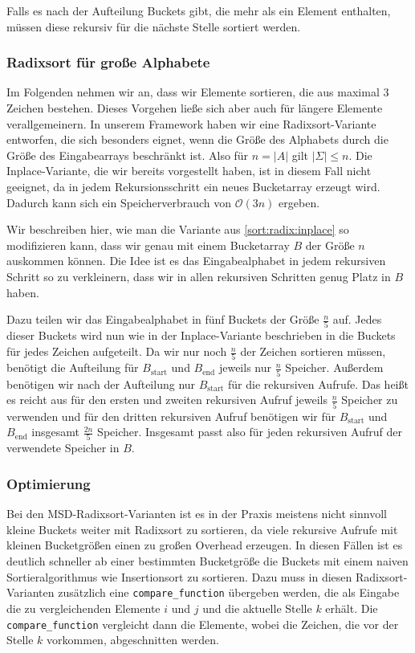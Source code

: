 Falls es nach der Aufteilung Buckets gibt, die mehr als ein Element enthalten,
müssen diese rekursiv für die nächste Stelle sortiert werden.

\subsubsection{Radixsort für große Alphabete}
\label{sort:radix:big_alph}

Im Folgenden nehmen wir an, dass wir Elemente sortieren,
die aus maximal $3$ Zeichen bestehen. Dieses Vorgehen ließe sich aber auch für längere Elemente verallgemeinern.
In unserem Framework haben wir eine Radixsort-Variante entworfen, die sich besonders eignet,
wenn die Größe des Alphabets durch die Größe des Eingabearrays beschränkt ist.
Also für $n=|A|$ gilt $|\Sigma| \le n$. Die Inplace-Variante, die wir bereits vorgestellt haben,
ist in diesem Fall nicht geeignet, da in jedem Rekursionsschritt ein neues Bucketarray erzeugt wird.
Dadurch kann sich ein Speicherverbrauch von $\mathcal O(3n)$ ergeben.

Wir beschreiben hier, wie man die Variante aus \cref{sort:radix:inplace} so modifizieren kann,
dass wir genau mit einem Bucketarray $B$ der Größe $n$ auskommen können.
Die Idee ist es das Eingabealphabet in jedem rekursiven Schritt so zu verkleinern,
dass wir in allen rekursiven Schritten genug Platz in $B$ haben.

Dazu teilen wir das Eingabealphabet in fünf Buckets der Größe $\frac{n}{5}$ auf.
Jedes dieser Buckets wird nun wie in der Inplace-Variante beschrieben in die Buckets für jedes Zeichen aufgeteilt.
Da wir nur noch $\frac{n}{5}$ der Zeichen sortieren müssen,
benötigt die Aufteilung für $B_{\text{start}}$ und $B_{\text{end}}$ jeweils nur $\frac{n}{5}$ Speicher.
Außerdem benötigen wir nach der Aufteilung nur $B_{\text{start}}$ für die rekursiven Aufrufe.
Das heißt es reicht aus für den ersten und zweiten rekursiven Aufruf jeweils $\frac{n}{5}$ Speicher zu verwenden
und für den dritten rekursiven Aufruf benötigen wir für $B_{\text{start}}$ und $B_{\text{end}}$
insgesamt $\frac{2n}{5}$ Speicher. Insgesamt passt also für jeden rekursiven Aufruf der verwendete Speicher in $B$.

\subsubsection{Optimierung}

Bei den MSD-Radixsort-Varianten ist es in der Praxis meistens nicht sinnvoll kleine Buckets
weiter mit Radixsort zu sortieren, da viele rekursive Aufrufe mit kleinen Bucketgrößen einen zu großen Overhead erzeugen.
In diesen Fällen ist es deutlich schneller ab einer bestimmten Bucketgröße die Buckets mit einem
naiven Sortieralgorithmus wie Insertionsort zu sortieren.
Dazu muss in diesen Radixsort-Varianten zusätzlich eine \texttt{compare\_function} übergeben werden,
die als Eingabe die zu vergleichenden Elemente $i$ und $j$ und die aktuelle Stelle $k$ erhält.
Die \texttt{compare\_function} vergleicht dann die Elemente, wobei die Zeichen, die vor der Stelle $k$ vorkommen,
abgeschnitten werden.
